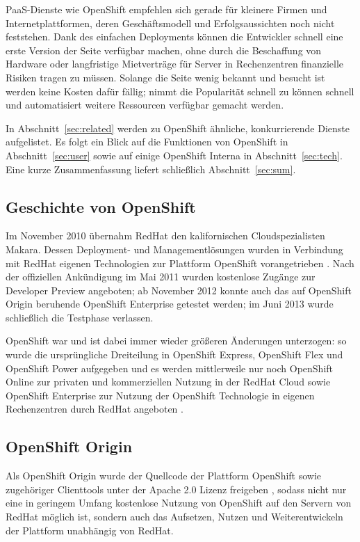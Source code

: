 \documentclass[10pt,a4paper,compsoc]{IEEEtran}
\begin{document}
PaaS-Dienste wie OpenShift empfehlen sich gerade für kleinere Firmen und Internetplattformen, deren Geschäftsmodell und Erfolgsaussichten noch nicht feststehen. Dank des einfachen Deployments können die Entwickler schnell eine erste Version der Seite verfügbar machen, ohne durch die Beschaffung von Hardware oder langfristige Mietverträge für Server in Rechenzentren finanzielle Risiken tragen zu müssen. Solange die Seite wenig bekannt und besucht ist werden keine Kosten dafür fällig; nimmt die Popularität schnell zu können schnell und automatisiert weitere Ressourcen verfügbar gemacht werden.

In Abschnitt~\ref{sec:related} werden zu OpenShift ähnliche, konkurrierende Dienste aufgelistet. Es folgt ein Blick auf die Funktionen von OpenShift in Abschnitt~\ref{sec:user} sowie auf einige OpenShift Interna in Abschnitt~\ref{sec:tech}. Eine kurze Zusammenfassung liefert schließlich Abschnitt~\ref{sec:sum}.

\subsection{Geschichte von OpenShift}
Im November 2010 übernahm RedHat den kalifornischen Cloudspezialisten Makara. Dessen Deployment- und Managementlösungen wurden in Verbindung mit RedHat eigenen Technologien zur Plattform OpenShift vorangetrieben \cite{openshift_primer}. Nach der offiziellen Ankündigung im Mai 2011 wurden kostenlose Zugänge zur Developer Preview angeboten; ab November 2012 konnte auch das auf OpenShift Origin beruhende OpenShift Enterprise getestet werden; im Juni 2013 wurde schließlich die Testphase verlassen\cite{os_enterprise}.

OpenShift war und ist dabei immer wieder größeren Änderungen unterzogen: so wurde die ursprüngliche Dreiteilung in OpenShift Express, OpenShift Flex und OpenShift Power aufgegeben und es werden mittlerweile nur noch OpenShift Online zur privaten und kommerziellen Nutzung in der RedHat Cloud sowie OpenShift Enterprise zur Nutzung der OpenShift Technologie in eigenen Rechenzentren durch RedHat angeboten \cite{cloud_kueche}.

\subsection{OpenShift Origin}
Als OpenShift Origin wurde der Quellcode der Plattform OpenShift sowie zugehöriger Clienttools unter der Apache 2.0 Lizenz freigeben \cite{os_code}\cite{apache_lic}, sodass nicht nur eine in geringem Umfang kostenlose Nutzung von OpenShift auf den Servern von RedHat möglich ist, sondern auch das Aufsetzen, Nutzen und Weiterentwickeln der Plattform unabhängig von RedHat.
\end{document}
